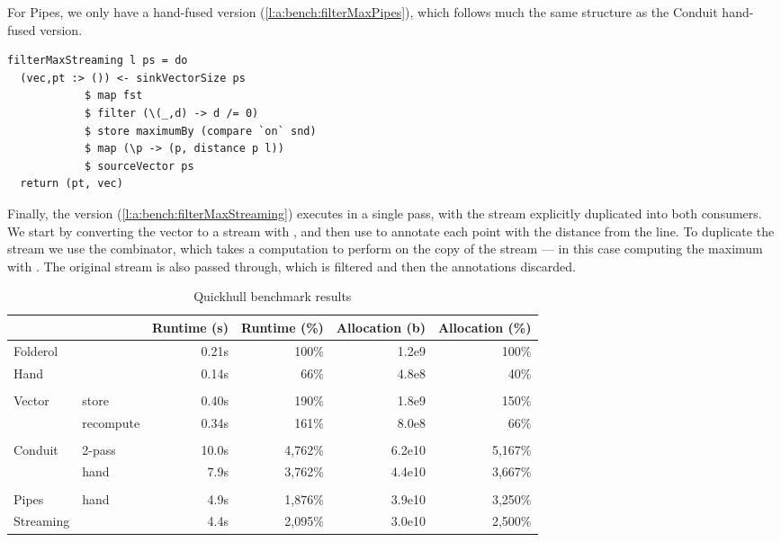 For Pipes, we only have a hand-fused version (\cref{l:a:bench:filterMaxPipes}), which follows much the same structure as the Conduit hand-fused version.

\begin{lstlisting}[float,label=l:a:bench:filterMaxStreaming,caption=Streaming implementation of \Hs/filterMax/]
filterMaxStreaming l ps = do
  (vec,pt :> ()) <- sinkVectorSize ps
            $ map fst
            $ filter (\(_,d) -> d /= 0)
            $ store maximumBy (compare `on` snd)
            $ map (\p -> (p, distance p l))
            $ sourceVector ps
  return (pt, vec)
\end{lstlisting}


Finally, the \Streaming version (\cref{l:a:bench:filterMaxStreaming}) executes in a single pass, with the stream explicitly duplicated into both consumers.
We start by converting the vector to a stream with \Hs@sourceVector@, and then use \Hs@map@ to annotate each point with the distance from the line.
To duplicate the stream we use the \Hs@store@ combinator, which takes a computation to perform on the copy of the stream --- in this case computing the maximum with \Hs@maximumBy@.
The original stream is also passed through, which is filtered and then the annotations discarded.

\begin{table}
\begin{center}
\begin{tabular}{ll|rrrr}
& & Runtime (s)  & Runtime (\%) & Allocation (b) & Allocation (\%) \\
\hline
Folderol &          & 0.21s &   100\% & 1.2e9 & 100\% \\
Hand     &          & 0.14s &    66\% & 4.8e8 &  40\% \\
&&&\\
Vector & store      & 0.40s &   190\% & 1.8e9 & 150\%\\
       & recompute  & 0.34s &   161\% & 8.0e8 & 66\%\\
&&&\\
Conduit & 2-pass    & 10.0s & 4,762\% & 6.2e10& 5,167\% \\
       & hand       &  7.9s & 3,762\% & 4.4e10& 3,667\% \\
&&&\\
Pipes  & hand       &  4.9s & 1,876\% & 3.9e10& 3,250\% \\
Streaming &         &  4.4s & 2,095\% & 3.0e10& 2,500\% \\
\end{tabular}
\end{center}
\caption[Quickhull benchmark results]{Quickhull benchmark results}
\label{table:bench:quickhull}
\end{table}

